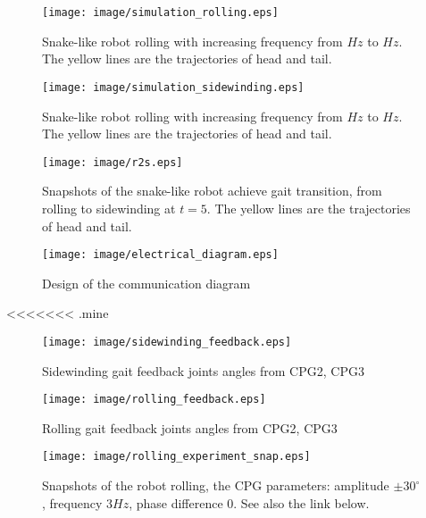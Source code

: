 \documentclass[letterpaper, 10 pt, conference]{ieeeconf}
\begin{document}
\begin{figure}[th]
\centering
    \texttt{[image: image/simulation\_rolling.eps]}
    \caption{Snake-like robot rolling with increasing frequency from $Hz$ to $Hz$. The yellow lines are the trajectories of head and tail.}
    \label{simulation_rolling}
\end{figure}

\begin{figure}[th]
    \centering
    \texttt{[image: image/simulation\_sidewinding.eps]}
    \caption{Snake-like robot rolling with increasing frequency from $Hz$ to $Hz$. The yellow lines are the trajectories of head and tail.}
    \label{simulation_sidewinding}
\end{figure}

\begin{figure*}[th]
\centering
\texttt{[image: image/r2s.eps]}
\caption{Snapshots of the snake-like robot achieve gait transition, from rolling to sidewinding at $t=5$. The yellow lines are the trajectories of head and tail. }
\label{r2s_snap}
\end{figure*}

\begin{figure*}[th]
\centering
\texttt{[image: image/electrical\_diagram.eps]}
\caption{Design of the communication diagram}
\label{electrical_diagram}
\end{figure*}
<<<<<<< .mine
\begin{figure}[th]
\centering
    \texttt{[image: image/sidewinding\_feedback.eps]}
    \caption{Sidewinding gait feedback joints angles from CPG2, CPG3}
    \label{sidewinding_feedback}
\end{figure}

\begin{figure}[th]
\centering
    \texttt{[image: image/rolling\_feedback.eps]}
    \caption{Rolling gait feedback joints angles from CPG2, CPG3}
    \label{rolling_feedback}
\end{figure}

\begin{figure*}[th]
\centering
\texttt{[image: image/rolling\_experiment\_snap.eps]}
\caption{Snapshots of the robot rolling, the CPG parameters: amplitude $\pm30^{\circ}$, frequency $3Hz$, phase difference $0$. See also the link below.}
\label{rolling_experiment_snap.eps}
\end{figure*}
\end{document}
